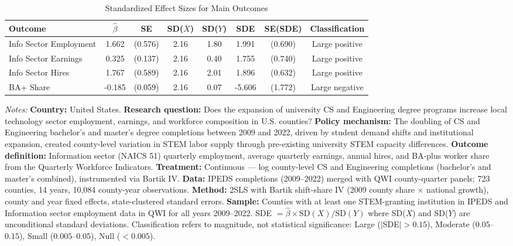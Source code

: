 \begin{table}[H]
\centering
\caption{Standardized Effect Sizes for Main Outcomes}
\label{tab:sde}
\begin{adjustbox}{max width=\textwidth}
\begin{threeparttable}
\begin{tabular}{lccccccc}
\toprule
Outcome & $\hat{\beta}$ & SE & SD($X$) & SD($Y$) & SDE & SE(SDE) & Classification \\
\midrule
  Info Sector Employment & 1.662 & (0.576) & 2.16 & 1.80 & 1.991 & (0.690) & Large positive \\
  Info Sector Earnings & 0.325 & (0.137) & 2.16 & 0.40 & 1.755 & (0.740) & Large positive \\
  Info Sector Hires & 1.767 & (0.589) & 2.16 & 2.01 & 1.896 & (0.632) & Large positive \\
  BA+ Share & -0.185 & (0.059) & 2.16 & 0.07 & -5.606 & (1.772) & Large negative \\
\bottomrule
\end{tabular}
\begin{tablenotes}[flushleft]
\footnotesize
\item \textit{Notes:} \textbf{Country:} United States. \textbf{Research question:} Does the expansion of university CS and Engineering degree programs increase local technology sector employment, earnings, and workforce composition in U.S. counties? \textbf{Policy mechanism:} The doubling of CS and Engineering bachelor's and master's degree completions between 2009 and 2022, driven by student demand shifts and institutional expansion, created county-level variation in STEM labor supply through pre-existing university STEM capacity differences. \textbf{Outcome definition:} Information sector (NAICS 51) quarterly employment, average quarterly earnings, annual hires, and BA-plus worker share from the Quarterly Workforce Indicators. \textbf{Treatment:} Continuous --- log county-level CS and Engineering completions (bachelor's and master's combined), instrumented via Bartik IV. \textbf{Data:} IPEDS completions (2009--2022) merged with QWI county-quarter panels; 723 counties, 14 years, 10,084 county-year observations. \textbf{Method:} 2SLS with Bartik shift-share IV (2009 county share $\times$ national growth), county and year fixed effects, state-clustered standard errors. \textbf{Sample:} Counties with at least one STEM-granting institution in IPEDS and Information sector employment data in QWI for all years 2009--2022. SDE $= \hat{\beta} \times \text{SD}(X) / \text{SD}(Y)$ where SD($X$) and SD($Y$) are unconditional standard deviations. Classification refers to magnitude, not statistical significance: Large ($|$SDE$| > 0.15$), Moderate ($0.05$--$0.15$), Small ($0.005$--$0.05$), Null ($< 0.005$).
\end{tablenotes}
\end{threeparttable}
\end{adjustbox}
\end{table}

